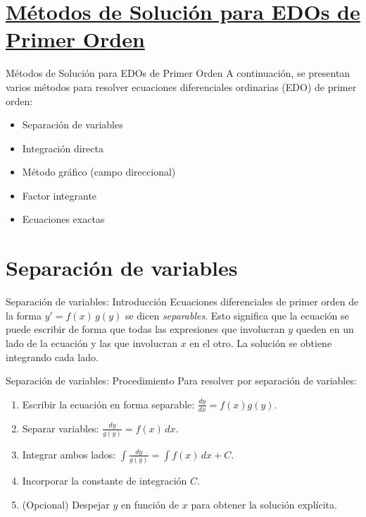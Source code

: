 \documentclass{beamer}
\begin{document}
\section[Métodos de Solución]{\texorpdfstring{\hyperlink{metodos}{Métodos de Solución para EDOs de Primer Orden}}{}}
\begin{frame}[label=metodos]{Métodos de Solución para EDOs de Primer Orden}
A continuación, se presentan varios métodos para resolver ecuaciones diferenciales ordinarias (EDO) de primer orden:
\begin{itemize}
  \item Separación de variables
  \item Integración directa
  \item Método gráfico (campo direccional)
  \item Factor integrante
  \item Ecuaciones exactas
\end{itemize}
\end{frame}


\section*{Separación de variables}
\begin{frame}{Separación de variables: Introducción}
Ecuaciones diferenciales de primer orden de la forma $y' = f(x)\,g(y)$ se dicen \emph{separables}. Esto significa que la ecuación se puede escribir de forma que todas las expresiones que involucran $y$ queden en un lado de la ecuación y las que involucran $x$ en el otro. La solución se obtiene integrando cada lado.
\end{frame}

\begin{frame}{Separación de variables: Procedimiento}
Para resolver por separación de variables:
\begin{enumerate}
  \item Escribir la ecuación en forma separable: $\displaystyle \frac{dy}{dx} = f(x) g(y)$.
  \item Separar variables: $\displaystyle \frac{dy}{g(y)} = f(x)\,dx$.
  \item Integrar ambos lados: $\displaystyle \int \frac{dy}{g(y)} = \int f(x)\,dx + C$.
  \item Incorporar la constante de integración $C$.
  \item (Opcional) Despejar $y$ en función de $x$ para obtener la solución explícita.
\end{enumerate}
\end{frame}
\end{document}
